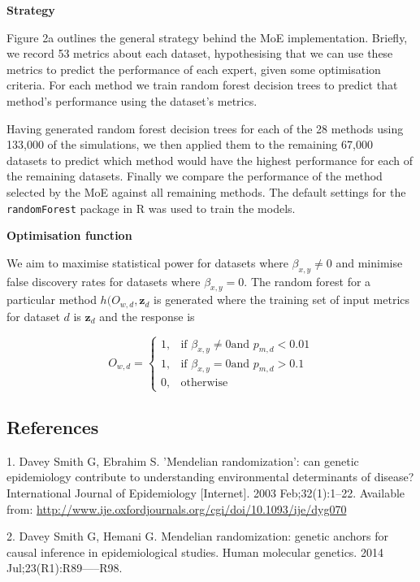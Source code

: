 \documentclass[]{article}
\begin{document}
\textbf{Strategy}

Figure 2a outlines the general strategy behind the MoE implementation.
Briefly, we record 53 metrics about each dataset, hypothesising that we
can use these metrics to predict the performance of each expert, given
some optimisation criteria. For each method we train random forest
decision trees to predict that method's performance using the dataset's
metrics.

Having generated random forest decision trees for each of the 28 methods
using 133,000 of the simulations, we then applied them to the remaining
67,000 datasets to predict which method would have the highest
performance for each of the remaining datasets. Finally we compare the
performance of the method selected by the MoE against all remaining
methods. The default settings for the \texttt{randomForest} package in R
was used to train the models.

\textbf{Optimisation function}

We aim to maximise statistical power for datasets where
\(\beta_{x,y} \neq 0\) and minimise false discovery rates for datasets
where \(\beta_{x,y} = 0\). The random forest for a particular method
\(h(O_{w,d}, \textbf{z}_{d}\) is generated where the training set of
input metrics for dataset \(d\) is \(\textbf{z}_{d}\) and the response
is

\[
    O_{w,d} = 
\begin{cases}
    1,              & \text{if } \beta_{x,y} \neq 0 \text{and } p_{m,d} < 0.01\\
    1,              & \text{if } \beta_{x,y} = 0 \text{and } p_{m,d} > 0.1 \\
    0,              & \text{otherwise}
\end{cases}
\]

\subsection*{References}\label{references}

\hypertarget{refs}{}
\hypertarget{ref-DaveySmith2003}{}
1. Davey Smith G, Ebrahim S. 'Mendelian randomization': can genetic
epidemiology contribute to understanding environmental determinants of
disease? International Journal of Epidemiology {[}Internet{]}. 2003
Feb;32(1):1--22. Available from:
\url{http://www.ije.oxfordjournals.org/cgi/doi/10.1093/ije/dyg070}

\hypertarget{ref-DaveySmithHemani2014}{}
2. Davey Smith G, Hemani G. Mendelian randomization: genetic anchors for
causal inference in epidemiological studies. Human molecular genetics.
2014 Jul;23(R1):R89-----R98.
\end{document}
